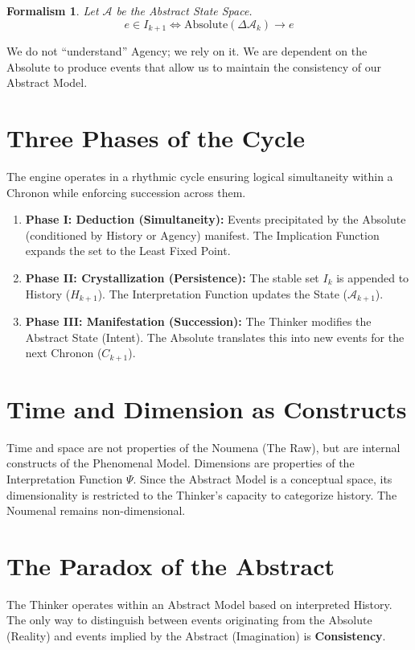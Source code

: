 \documentclass[12pt, a4paper]{article}
\newtheorem{formalism}{Formalism}
\begin{document}
\begin{formalism}
Let $\mathcal{A}$ be the Abstract State Space.
$$e \in I_{k+1} \iff \text{Absolute}(\Delta \mathcal{A}_k) \to e$$
\end{formalism}

We do not ``understand'' Agency; we rely on it. We are dependent on the Absolute to produce events that allow us to maintain the consistency of our Abstract Model.

\section{Three Phases of the Cycle}

The engine operates in a rhythmic cycle ensuring logical simultaneity within a Chronon while enforcing succession across them.

\begin{enumerate}
    \item \textbf{Phase I: Deduction (Simultaneity):} Events precipitated by the Absolute (conditioned by History or Agency) manifest. The Implication Function expands the set to the Least Fixed Point.
    \item \textbf{Phase II: Crystallization (Persistence):} The stable set $I_k$ is appended to History ($H_{k+1}$). The Interpretation Function updates the State ($\mathcal{A}_{k+1}$).
    \item \textbf{Phase III: Manifestation (Succession):} The Thinker modifies the Abstract State (Intent). The Absolute translates this into new events for the next Chronon ($C_{k+1}$).
\end{enumerate}

\section{Time and Dimension as Constructs}

Time and space are not properties of the Noumena (The Raw), but are internal constructs of the Phenomenal Model. Dimensions are properties of the Interpretation Function $\Psi$. Since the Abstract Model is a conceptual space, its dimensionality is restricted to the Thinker’s capacity to categorize history. The Noumenal remains non-dimensional.

\section{The Paradox of the Abstract}

The Thinker operates within an Abstract Model based on interpreted History. The only way to distinguish between events originating from the Absolute (Reality) and events implied by the Abstract (Imagination) is \textbf{Consistency}.
\end{document}
